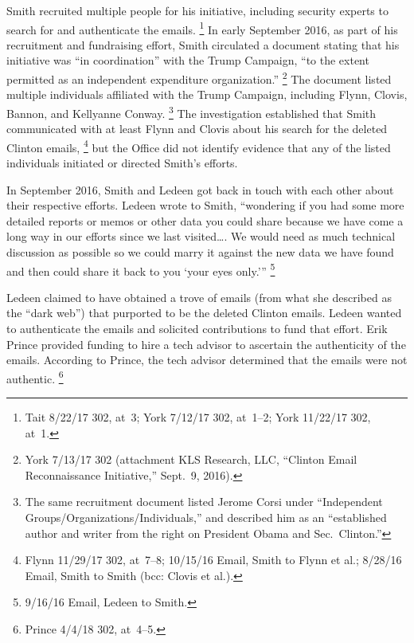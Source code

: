 Smith recruited multiple people for his initiative, including security experts to search for and authenticate the emails.%
\footnote{Tait 8/22/17 302, at~3; York 7/12/17 302, at~1--2; York 11/22/17 302, at~1.}
In early September 2016, as part of his recruitment and fundraising effort, Smith circulated a document stating that his initiative was ``in coordination'' with the Trump Campaign, ``to the extent permitted as an independent expenditure organization.''%
\footnote{York 7/13/17 302 (attachment KLS Research, LLC, ``Clinton Email Reconnaissance Initiative,'' Sept.~9, 2016).}
The document listed multiple individuals affiliated with the Trump Campaign, including Flynn, Clovis, Bannon,
and Kellyanne Conway.%
\footnote{The same recruitment document listed Jerome Corsi under ``Independent Groups/Organizations/Individuals,'' and described him as an ``established author and writer from the right on President Obama and Sec.~Clinton.''}
The investigation established that Smith communicated with at least Flynn and Clovis about his search for the deleted Clinton emails,%
\footnote{Flynn 11/29/17 302, at~7--8; 10/15/16 Email, Smith to Flynn et al.;
8/28/16 Email, Smith to Smith (bcc: Clovis et al.).}
but the Office did not identify evidence that any of the listed individuals initiated or directed Smith's efforts.

In September 2016, Smith and Ledeen got back in touch with each other about their respective efforts.
Ledeen wrote to Smith, ``wondering if you had some more detailed reports or memos or other data you could share because we have come a long way in our efforts since we last visited\dots.
We would need as much technical discussion as possible so we could marry it against the new data we have found and then could share it back to you `your eyes only.'\thinspace''%
\footnote{9/16/16 Email, Ledeen to Smith.}

Ledeen claimed to have obtained a trove of emails (from what she described as the ``dark web'') that purported to be the deleted Clinton emails.
Ledeen wanted to authenticate the emails and solicited contributions to fund that effort.
Erik Prince provided funding to hire a tech advisor to ascertain the authenticity of the emails.
According to Prince, the tech advisor determined that the emails were not authentic.%
\footnote{Prince 4/4/18 302, at~4--5.}

